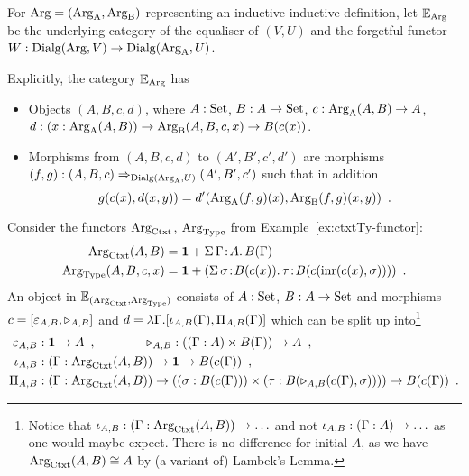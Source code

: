 \documentclass[orivec,envcountsame, ,envcountsect]{llncs}
\begin{document}
\begin{definition}
  For $\text{Arg} = (\text{Arg}_{\text{A}}, \text{Arg}_{\text{B}})$ representing an inductive-inductive
  definition, let $\mathbb{E}_{\text{Arg}}$ be the underlying category of
  the equaliser of $(V, U)$ and the forgetful functor ${W :
    \text{Dialg}(\text{Arg}, V) \to \text{Dialg}(\text{Arg}_{\text{A}}, U)}$.
\end{definition}
Explicitly, the category $\mathbb{E}_{\text{Arg}}$ has
\begin{itemize}
\item Objects $(A, B, c, d)$, where $A : \text{Set}$, $B : A \to \text{Set}$, $c : \text{Arg}_{\text{A}}(A, B) \to A$, $d : (x : \text{Arg}_{\text{A}}(A, B)) \to \text{Arg}_{\text{B}}(A, B, c, x) \to B(c(x))$.
\item Morphisms from $(A, B, c, d)$ to $(A', B', c', d')$ are morphisms \\ $(f, g) :
  (A, B, c) \Rightarrow_{\text{Dialg}(\text{Arg}_{\text{A}}, U)} (A', B', c')$ such that in addition
  \[
  g(c(x), d(x, y)) = d'(\text{Arg}_{\text{A}}(f,g)(x), \text{Arg}_{\text{B}}(f,g)(x, y)) \enspace .
  \]
\end{itemize}


\begin{example}
  Consider the functors $\text{Arg}_{\text{Ctxt}}$, $\text{Arg}_{\text{Type}}$ from Example~\ref{ex:ctxtTy-functor}:
\begin{align*}
  \text{Arg}_{\text{Ctxt}}(A, B) &= \mathbf{1} + \Sigma\, \Gamma\!:\!A .\, B(\Gamma)\\
  \text{Arg}_{\text{Type}}(A, B, c, x) &= \mathbf{1} + (\Sigma\,  \sigma\!:\! B(c(x)).\, \tau\!:\!B(c(\text{inr}(c(x), \sigma))) ) \enspace .
\end{align*}
An object in $\mathbb{E}_{(\text{Arg}_{\text{Ctxt}}, \text{Arg}_{\text{Type}})}$ consists of $A : \text{Set}$, $B :
A \to \text{Set}$ and morphisms $c =
[\varepsilon_{A,B}, \triangleright_{A,B}]$ and $d = \lambda \Gamma . [\iota_{A,B}(\Gamma), \Pi_{A,B}(\Gamma)]$ which can be
split up into\footnote{Notice that $\iota_{A,B} : (\Gamma :
  \text{Arg}_{\text{Ctxt}}(A, B)) \to \ldots$ and not $\iota_{A,B} : (\Gamma :
  A) \to \ldots$ as one would maybe expect. There is no difference for
  initial $A$, as we have $\text{Arg}_{\text{Ctxt}}(A, B) \cong A$ by (a
  variant of) Lambek's Lemma.}
\begin{align*}
  \varepsilon_{A,B} &: \mathbf{1} \to A \enspace , \qquad\qquad \triangleright_{A,B} : ((\Gamma : A) \times B(\Gamma)) \to A  \enspace , \\
\iota_{A,B} &: (\Gamma : \text{Arg}_{\text{Ctxt}}(A, B)) \to \mathbf{1} \to B(c(\Gamma)) \enspace , \\
\Pi_{A,B} &: (\Gamma : \text{Arg}_{\text{Ctxt}}(A, B)) \to ((\sigma : B(c(\Gamma))) \times (\tau : B(\triangleright_{A,B}(c(\Gamma), \sigma)))) \to B(c(\Gamma)) \enspace.
\end{align*}
\end{example}
\end{document}
